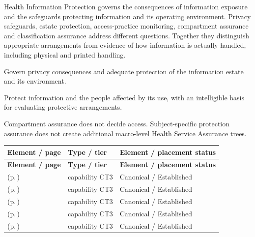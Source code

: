 Health Information Protection governs the consequences of information exposure and the safeguards protecting information and its operating environment. Privacy safeguards, estate protection, access-practice monitoring, compartment assurance and classification assurance address different questions. Together they distinguish appropriate arrangements from evidence of how information is actually handled, including physical and printed handling.



Govern privacy consequences and adequate protection of the information estate and its environment.



Protect information and the people affected by its use, with an intelligible basis for evaluating protective arrangements.



Compartment assurance does not decide access. Subject-specific protection assurance does not create additional macro-level Health Service Assurance trees.


\begingroup\small\setlength{\TableWidth}{\dimexpr\linewidth-6\tabcolsep-4\arrayrulewidth\relax}
\begin{longtable}{|>{\raggedright\arraybackslash}p{0.52\TableWidth}|>{\raggedright\arraybackslash}p{0.2\TableWidth}|>{\raggedright\arraybackslash}p{0.28\TableWidth}|}
\hline\rowcolor{TableHead}\textbf{Element / page} & \textbf{Type / tier} & \textbf{Element / placement status}\\\hline\endfirsthead
\hline\rowcolor{TableHead}\textbf{Element / page} & \textbf{Type / tier} & \textbf{Element / placement status}\\\hline\endhead
\hline\endfoot
\nameref{cap:bc-health-privacy-safeguard-management} (p.\,\pageref{cap:bc-health-privacy-safeguard-management}) & capability CT3 & Canonical / Established\\\hline
\nameref{cap:bc-health-information-safeguarding} (p.\,\pageref{cap:bc-health-information-safeguarding}) & capability CT3 & Canonical / Established\\\hline
\nameref{cap:bc-health-information-access-monitoring} (p.\,\pageref{cap:bc-health-information-access-monitoring}) & capability CT3 & Canonical / Established\\\hline
\nameref{cap:bc-health-information-compartment-assurance} (p.\,\pageref{cap:bc-health-information-compartment-assurance}) & capability CT3 & Canonical / Established\\\hline
\nameref{cap:bc-health-information-classification-assurance} (p.\,\pageref{cap:bc-health-information-classification-assurance}) & capability CT3 & Canonical / Established\\\hline
\end{longtable}\endgroup

